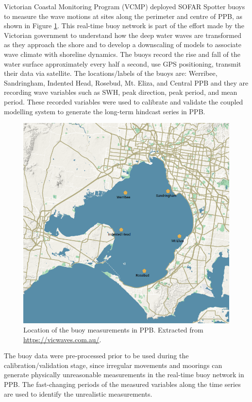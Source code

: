 \documentclass[12pt]{article}
\begin{document}
Victorian Coastal Monitoring Program (VCMP) deployed SOFAR Spotter buoys to measure the wave motions at sites along the perimeter and centre of PPB, as shown in Figure \ref{fig:buoy_measurements}. This real-time buoy network is part of the effort made by the Victorian government to understand how the deep water waves are transformed as they approach the shore and to develop a downscaling of models to associate wave climate with shoreline dynamics. The buoys record the rise and fall of the water surface approximately every half a second, use GPS positioning, transmit their data via satellite. The locations/labels of the buoys are: Werribee, Sandringham, Indented Head, Rosebud, Mt. Eliza, and Central PPB and they are recording wave variables such as SWH, peak direction, peak period, and mean period. These recorded variables were used to calibrate and validate the coupled modelling system to generate the long-term hindcast series in PPB.

\begin{figure}[h]
\centering
  \includegraphics[scale=0.3]{plots/maps/vicwaves_buoy_locations.png}
  \caption{Location of the buoy measurements in PPB. Extracted from \url{https://vicwaves.com.au/}.}
  \label{fig:buoy_measurements}
\end{figure}

The buoy data were pre-processed prior to be used during the calibration/validation stage, since irregular movements and moorings can generate physically unreasonable measurements in the real-time buoy network in PPB. The fast-changing periods of the measured variables along the time series are used to identify the unrealistic measurements.\\
\end{document}
